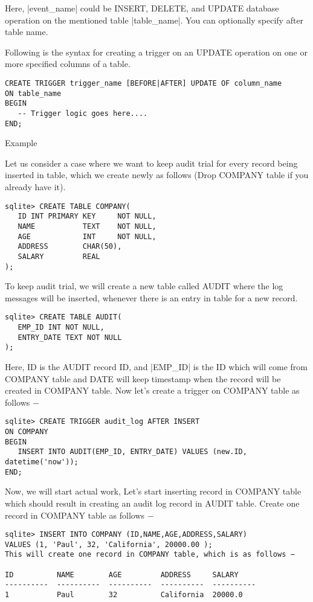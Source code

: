Here, |event_name| could be INSERT, DELETE, and UPDATE database operation on the mentioned table |table_name|. You can optionally specify  after table name.

Following is the syntax for creating a trigger on an UPDATE operation on one or more specified columns of a table.


\begin{verbatim}
CREATE TRIGGER trigger_name [BEFORE|AFTER] UPDATE OF column_name 
ON table_name
BEGIN
   -- Trigger logic goes here....
END;
\end{verbatim}

Example

Let us consider a case where we want to keep audit trial for every record being inserted in  table, which we create newly as follows (Drop COMPANY table if you already have it).


\begin{verbatim}
sqlite> CREATE TABLE COMPANY(
   ID INT PRIMARY KEY     NOT NULL,
   NAME           TEXT    NOT NULL,
   AGE            INT     NOT NULL,
   ADDRESS        CHAR(50),
   SALARY         REAL
);
\end{verbatim}


To keep audit trial, we will create a new table called AUDIT where the log messages will be inserted, whenever there is an entry in  table for a new record.

\begin{verbatim}
sqlite> CREATE TABLE AUDIT(
   EMP_ID INT NOT NULL,
   ENTRY_DATE TEXT NOT NULL
);
\end{verbatim}

Here, ID is the AUDIT record ID, and |EMP_ID| is the ID which will come from COMPANY table and DATE will keep timestamp when the record will be created in COMPANY table. Now let's create a trigger on COMPANY table as follows −

\begin{verbatim}
sqlite> CREATE TRIGGER audit_log AFTER INSERT 
ON COMPANY
BEGIN
   INSERT INTO AUDIT(EMP_ID, ENTRY_DATE) VALUES (new.ID, datetime('now'));
END;
\end{verbatim}

Now, we will start actual work, Let's start inserting record in COMPANY table which should result in creating an audit log record in AUDIT table. Create one record in COMPANY table as follows −

\begin{verbatim}
sqlite> INSERT INTO COMPANY (ID,NAME,AGE,ADDRESS,SALARY)
VALUES (1, 'Paul', 32, 'California', 20000.00 );
This will create one record in COMPANY table, which is as follows −

ID          NAME        AGE         ADDRESS     SALARY
----------  ----------  ----------  ----------  ----------
1           Paul        32          California  20000.0
\end{verbatim}

